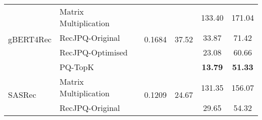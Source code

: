 \begin{tabular}{llcccc}
\multicolumn{1}{l|}{\multirow{4}{*}{gBERT4Rec}}                               & \multicolumn{1}{l|}{Matrix Multiplication}                                               & \multirow{4}{*}{0.1684}                            & \multirow{4}{*}{37.52}                                      & 133.40                                                  & 171.04                                                \\
\multicolumn{1}{l|}{}                                                         & \multicolumn{1}{l|}{RecJPQ-Original}                                                     &                                                    &                                                             & 33.87                                                   & 71.42                                                 \\
\multicolumn{1}{l|}{}                                                         & \multicolumn{1}{l|}{RecJPQ-Optimised}                                                    &                                                    &                                                             & 23.08                                                   & 60.66                                                 \\
\multicolumn{1}{l|}{}                                                         & \multicolumn{1}{l|}{PQ-TopK}                                                             &                                                    &                                                             & \textbf{13.79}                                          & \textbf{51.33}                                        \\ \hline
\multicolumn{1}{l|}{\multirow{4}{*}{SASRec}}                                  & \multicolumn{1}{l|}{Matrix Multiplication}                                               & \multirow{4}{*}{0.1209}                            & \multirow{4}{*}{24.67}                                      & 131.35                                                  & 156.07                                                \\
\multicolumn{1}{l|}{}                                                         & \multicolumn{1}{l|}{RecJPQ-Original}                                                     &                                                    &                                                             & 29.65                                                   & 54.32                                                 \\

\end{tabular}
